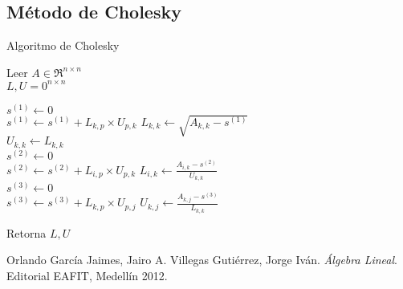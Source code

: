 \documentclass[12pt]{article}
\begin{document}
	\subsection{Método de Cholesky}
	\begin{algorithm}[H]
		\caption{Algoritmo de Cholesky}
		Leer $A \in \Re^{n\times n}$\\
		$L, U = 0^{n\times n}$\\
		{
			$s^{(1)} \leftarrow 0$\\
			{
				$s^{(1)} \leftarrow s^{(1)} + L_{k,p} \times U_{p, k}$
			}
			$L_{k, k} \leftarrow \sqrt{A_{k, k} - s^{(1)}}$\\
			$U_{k, k} \leftarrow L_{k, k}$\\
			{
				$s^{(2)} \leftarrow 0$\\
				{
					$s^{(2)} \leftarrow s^{(2)} + L_{i,p} \times U_{p, k}$	
				}
				$L_{i, k} \leftarrow \frac{A_{i, k} - s^{(2)}}{U_{k, k}}$\\
			}
			{
				$s^{(3)} \leftarrow 0$\\
				{
					$s^{(3)} \leftarrow s^{(3)} + L_{k,p} \times U_{p, j}$	
				}
				$U_{k, j} \leftarrow \frac{A_{k, j} - s^{(3)}}{L_{k, k}}$\\
			}
				
		}
		Retorna $L, U$
	\end{algorithm}
        \begin{thebibliography}{9}
            Orlando García Jaimes, Jairo A. Villegas Gutiérrez, Jorge Iván. \textit{Álgebra Lineal}. Editorial EAFIT, Medellín 2012. 
        \end{thebibliography}
    
\end{document}
